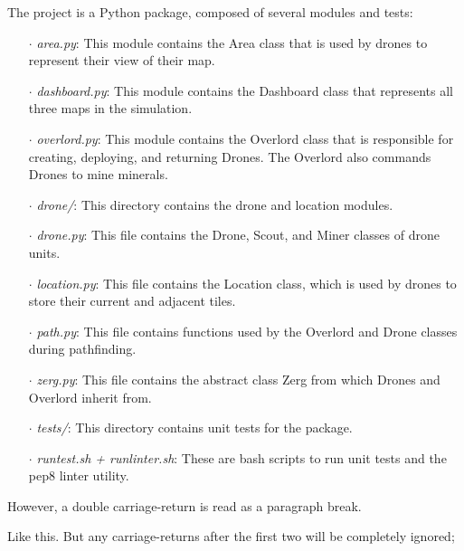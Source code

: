 \documentclass{article}
\begin{document}
The project is a Python package, composed of several modules and tests:
\begin{itemize}
	\item [$\cdot$] \textit{area.py}: This module contains the Area class
	that is used by drones to represent their view of their map.
	\item [$\cdot$] \textit{dashboard.py}: This module contains the
	Dashboard class that represents all three maps in the simulation.
	\item [$\cdot$] \textit{overlord.py}: This module contains the
	Overlord class that is responsible for creating, deploying, and 
	returning Drones. The Overlord also commands Drones to mine minerals.
	\item [$\cdot$] \textit{drone/}: This directory contains the drone and 
	location modules.
	\item [$\cdot$] \textit{drone.py}: This file contains the Drone, Scout,
	and Miner classes of drone units. 
	\item [$\cdot$] \textit{location.py}: This file contains the Location
	class, which is used by drones to store their current and adjacent 
	tiles.
	\item [$\cdot$] \textit{path.py}: This file contains functions used by
	the Overlord and Drone classes during pathfinding.
	\item [$\cdot$] \textit{zerg.py}: This file contains the abstract class
	Zerg from which Drones and Overlord inherit from.
	\item [$\cdot$] \textit{tests/}: This directory contains unit tests for
	the package.
	\item [$\cdot$] \textit{runtest.sh + runlinter.sh}: These are bash
	scripts to run unit tests and the pep8 linter utility.
\end{itemize}
However, a double carriage-return is read as a paragraph break.

Like this.  But any carriage-returns after the first two will be 
completely ignored; 
\end{document}
